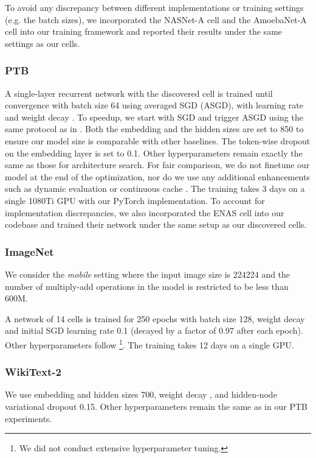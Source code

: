 \documentclass{article}
\begin{document}
To avoid any discrepancy between different implementations or training settings (e.g. the batch sizes),
we incorporated the NASNet-A cell \citep{zoph2017learning} and the AmoebaNet-A cell \citep{real2018regularized} into our training framework and reported their results under the same settings as our cells.

\subsubsection{PTB}
\label{sec:eval-ptb}
A single-layer recurrent network with the discovered cell is trained until convergence with batch size 64 using averaged SGD \citep{polyak1992acceleration} (ASGD),
with learning rate  and weight decay .
To speedup,
we start with SGD and trigger ASGD 
using the same protocol as in \cite{yang2017breaking, merity2017regularizing}.
Both the embedding and the hidden sizes are set to 850 
to ensure our model size is comparable with other baselines.
The token-wise dropout on the embedding layer is set to 0.1.
Other hyperparameters remain exactly the same as those for architecture search.
For fair comparison,
we do not finetune our model at the end of the optimization,
nor do we use any additional enhancements such as dynamic evaluation \citep{krause2017dynamic} or continuous cache \citep{grave2016improving}.
The training takes 3 days on a single 1080Ti GPU with our PyTorch implementation.
To account for implementation discrepancies,
we also incorporated the ENAS cell \citep{pham2018efficient}
into our codebase and trained their network under the same setup as our discovered cells.

\subsubsection{ImageNet}
\label{sec:eval-imagenet}
We consider the \emph{mobile} setting
where the input image size is 224224
and the number of multiply-add operations in the model is restricted to be less than 600M.

A network of 14 cells is trained for 250 epochs
with batch size 128, weight decay  and initial SGD learning rate 0.1 (decayed by a factor of 0.97 after each epoch).
Other hyperparameters follow \cite{zoph2017learning, real2018regularized, liu2017progressive}\footnote{We did not conduct extensive hyperparameter tuning.}.
The training takes 12 days on a single GPU.

\subsubsection{WikiText-2}
\label{sec:eval-wt2}
We use embedding and hidden sizes 700, weight decay ,
and hidden-node variational dropout 0.15.
Other hyperparameters remain the same as in our PTB experiments.
\end{document}
